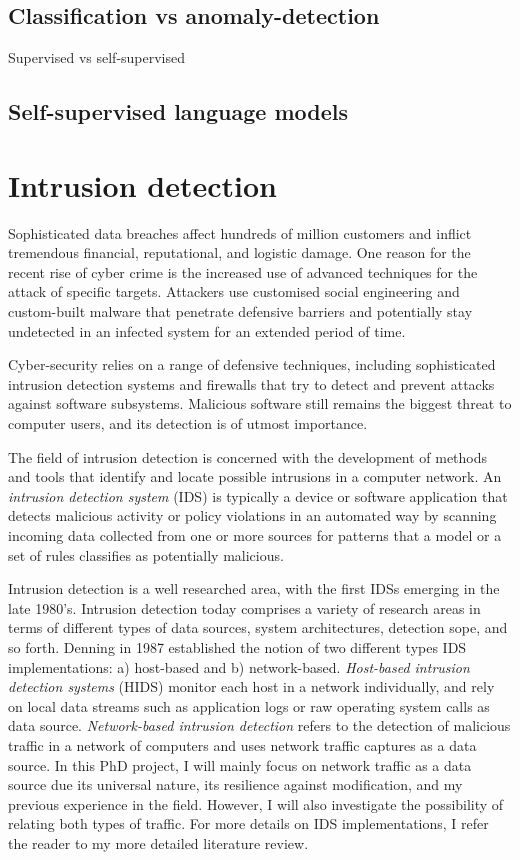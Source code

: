 \subsection{Classification vs anomaly-detection}
Supervised vs self-supervised

\subsection{Self-supervised language models}

\section{Intrusion detection}

Sophisticated data breaches affect hundreds of million customers and inflict tremendous financial, reputational, and logistic damage. One reason for the recent rise of cyber crime is the increased use of advanced techniques for the attack of specific targets. Attackers use customised social engineering and custom-built malware that penetrate defensive barriers and potentially stay undetected in an infected system for an extended period of time. 

Cyber-security relies on a range of defensive techniques, including sophisticated intrusion detection systems and firewalls that try to detect and prevent attacks against software subsystems. Malicious software still remains the biggest threat to computer users, and its detection is of utmost importance. 

The field of intrusion detection is concerned with the development of methods and tools that identify and locate possible intrusions in a computer network. An \textit{intrusion detection system} (IDS) is typically a device or software application that detects malicious activity or policy violations in an automated way by scanning incoming data collected from one or more sources for patterns that a model or a set of rules classifies as potentially malicious.

Intrusion detection is a well researched area, with the first IDSs emerging in the late 1980's. Intrusion detection today comprises a variety of research areas in terms of different types of data sources, system architectures, detection sope, and so forth. Denning \cite{denning1987intrusion} in 1987 established the notion of two different types IDS implementations: a) host-based and b) network-based. 
\textit{Host-based intrusion detection systems} (HIDS) monitor each host in a network individually, and rely on local data streams such as application logs or raw operating system calls as  data source. \textit{Network-based intrusion detection} refers to the detection of malicious traffic in a network of computers and uses network traffic captures as a data source. In this PhD project, I will mainly focus on network traffic as a data source due its universal nature, its resilience against modification, and my previous experience in the field. However, I will also investigate the possibility of relating both types of traffic. For more details on IDS implementations, I refer the reader to my more detailed literature review. 


